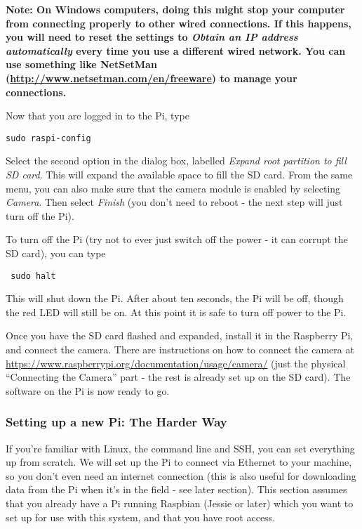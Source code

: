 \documentclass[10pt]{article}
\begin{document}
\textbf{Note: On Windows computers, doing this might stop your computer from connecting properly to other wired connections. If this happens, you will need to reset the settings to \textit{Obtain an IP address automatically} every time you use a different wired network. You can use something like NetSetMan (\url{http://www.netsetman.com/en/freeware}) to manage your connections.} \newline

Now that you are logged in to the Pi, type 
\begin{verbatim}
sudo raspi-config
\end{verbatim}

Select the second option in the dialog box, labelled \textit{Expand root partition to fill SD card}. This will expand the available space to fill the SD card. From the same menu, you can also make sure that the camera module is enabled by selecting \textit{Camera}. Then select \textit{Finish} (you don't need to reboot - the next step will just turn off the Pi).

To turn off the Pi (try not to ever just switch off the power - it can corrupt the SD card), you can type
\begin{verbatim}
 sudo halt
\end{verbatim}

This will shut down the Pi. After about ten seconds, the Pi will be off, though the red LED will still be on. At this point it is safe to turn off power to the Pi.
 
Once you have the SD card flashed and expanded, install it in the Raspberry Pi, and connect the camera. There are instructions on how to connect the camera at
\url{https://www.raspberrypi.org/documentation/usage/camera/} (just the physical ``Connecting the Camera'' part - the rest is already set up on the SD card). The software on the Pi is now ready to go. 

\subsubsection{Setting up a new Pi: The Harder Way}
If you're familiar with Linux, the command line and SSH, you can set everything up from scratch. We will set up the Pi to connect via Ethernet to your machine, so you don't even need an internet connection (this is also useful for downloading data from the Pi when it's in the field - see later section). This section assumes that you already have a Pi running Raspbian (Jessie or later) which you want to set up for use with this system, and that you have root access. 
\end{document}
